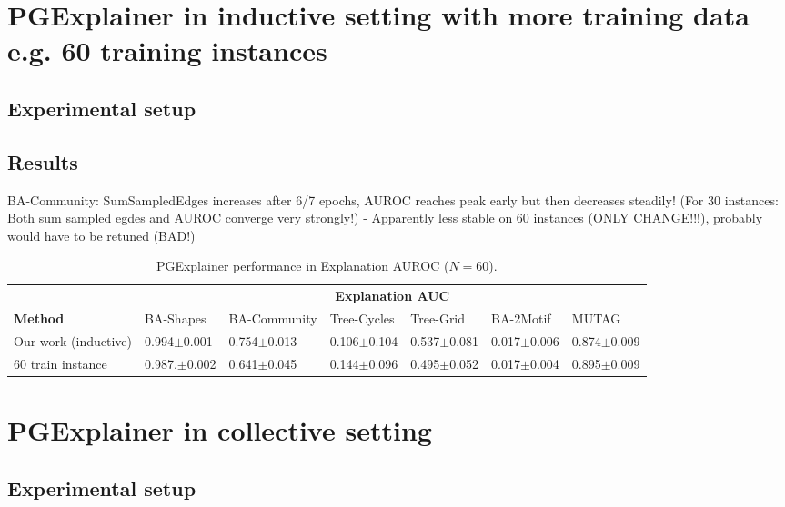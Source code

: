 \section{PGExplainer in inductive setting with more training data e.g. 60 training instances}

\subsection{Experimental setup}

\subsection{Results}


BA-Community: SumSampledEdges increases after 6/7 epochs, AUROC reaches peak early but then decreases steadily! (For 30 instances: Both sum sampled egdes and AUROC converge very strongly!) - Apparently less stable on 60 instances (ONLY CHANGE!!!), probably would have to be retuned (BAD!)
\begin{table}[ht]
    \centering
    \scriptsize
    \begin{tabularx}{\textwidth}{l*{6}{X}}   %
    \toprule
    \textbf{} & \multicolumn{6}{c}{\textbf{Explanation AUC}} \\
    \cmidrule{2-7}
    \textbf{Method} & BA-Shapes & BA-Community & Tree-Cycles & Tree-Grid & BA-2Motif & MUTAG \\
    \midrule
    Our work (inductive) & 0.994$\pm$0.001 & 0.754$\pm$0.013 & 0.106$\pm$0.104 & 0.537$\pm$0.081 & 0.017$\pm$0.006 & 0.874$\pm$0.009 \\
    \midrule
    60 train instance & 0.987.$\pm$0.002 & 0.641$\pm$0.045 & 0.144$\pm$0.096 & 0.495$\pm$0.052 & 0.017$\pm$0.004 & 0.895$\pm$0.009 \\
    \bottomrule
    \end{tabularx}
    \caption{PGExplainer performance in Explanation AUROC ($N=60$).}
    \label{tab:pgexplainer_auc}
\end{table}


\section{PGExplainer in collective setting}

\subsection{Experimental setup}

